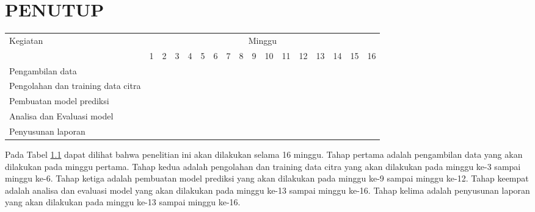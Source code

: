 \chapter{PENUTUP}

\newcommand{\w}{}
\newcommand{\G}{\cellcolor{gray}}
\begin{table}[H]
  \label{tbl:timeline}
  \begin{tabular}{|p{3.5cm}|c|c|c|c|c|c|c|c|c|c|c|c|c|c|c|c|}

    \hline
    \multirow{2}{*}{Kegiatan}          & \multicolumn{16}{|c|}{Minggu}                                                                       \\
    \cline{2-17}                       &
    1                                  & 2                             & 3  & 4  & 5  & 6  & 7  & 8  & 9  & 10 & 11 & 12 & 13 & 14 & 15 & 16 \\
    \hline

    Pengambilan data                   &
    \G                                 & \G                            & \w & \w & \w & \w & \w & \w & \w & \w & \w & \w & \w & \w & \w & \w \\
    \hline

    Pengolahan dan training data citra &
    \w                                 & \w                            & \G & \G & \G & \G & \G & \G & \w & \w & \w & \w & \w & \w & \w & \w \\
    \hline

    Pembuatan model prediksi           &
    \w                                 & \w                            & \w & \w & \w & \w & \w & \w & \G & \G & \G & \G & \w & \w & \w & \w \\
    \hline

    Analisa dan Evaluasi model         &
    \w                                 & \w                            & \w & \w & \w & \w & \w & \w & \w & \w & \w & \G & \G & \G & \G & \w \\
    \hline

    Penyusunan laporan                 &
    \w                                 & \w                            & \w & \w & \w & \w & \w & \w & \w & \w & \G & \G & \G & \G & \G & \G \\
    \hline
  \end{tabular}
\end{table}

Pada Tabel \ref{tbl:timeline} dapat dilihat bahwa penelitian ini akan dilakukan selama 16 minggu. Tahap pertama adalah pengambilan data yang akan dilakukan pada minggu pertama. Tahap kedua adalah pengolahan dan training data citra yang akan dilakukan pada minggu ke-3 sampai minggu ke-6. Tahap ketiga adalah pembuatan model prediksi yang akan dilakukan pada minggu ke-9 sampai minggu ke-12. Tahap keempat adalah analisa dan evaluasi model yang akan dilakukan pada minggu ke-13 sampai minggu ke-16. Tahap kelima adalah penyusunan laporan yang akan dilakukan pada minggu ke-13 sampai minggu ke-16.
